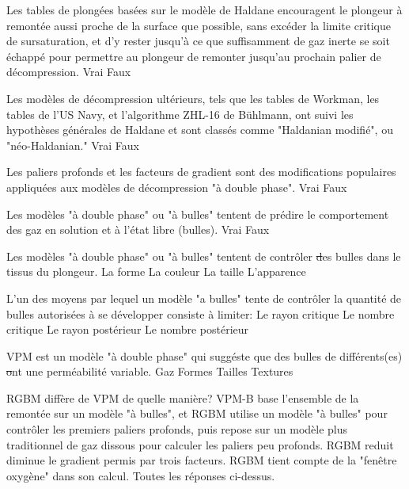 \documentclass[english,10pt,a4paper,twoside]{article}
\begin{document}
	\begin{outline}

		\1 Les tables de plongées basées sur le modèle de Haldane encouragent le plongeur à remontée aussi proche de la surface que possible, sans excéder la limite critique de sursaturation, et d'y rester jusqu'à ce que suffisamment de gaz inerte se soit échappé pour permettre au plongeur de remonter jusqu'au prochain palier de décompression.
			\2 Vrai
			\2 Faux

		\1 Les modèles de décompression ultérieurs, tels que les tables de Workman, les tables de l'US Navy, et l'algorithme ZHL-16 de Bühlmann, ont suivi les hypothèses générales de Haldane et sont classés comme "Haldanian modifié", ou "néo-Haldanian."
			\2 Vrai
			\2 Faux

		\1 Les paliers profonds et les facteurs de gradient sont des modifications populaires appliquées aux modèles de décompression "à double phase".
			\2 Vrai
			\2 Faux

		\1 Les modèles "à double phase" ou "à bulles" tentent de prédire le comportement des gaz en solution et à l'état libre (bulles).
			\2 Vrai
			\2 Faux

		\1 Les modèles "à double phase" ou "à bulles" tentent de contrôler \st des bulles dans le tissus du plongeur.
			\2 La forme
			\2 La couleur
			\2 La taille
			\2 L'apparence

		\1 L'un des moyens par lequel un modèle "a bulles" tente de contrôler la quantité de bulles autorisées à se développer consiste à limiter:
			\2 Le rayon critique
			\2 Le nombre critique
			\2 Le rayon postérieur
			\2 Le nombre postérieur

		\1 VPM est un modèle "à double phase" qui suggéste que des bulles de différents(es) \st ont une perméabilité variable.
			\2 Gaz
			\2 Formes
			\2 Tailles
			\2 Textures

		\1 RGBM diffère de VPM de quelle manière?
			\2 VPM-B base l'ensemble de la remontée sur un modèle "à bulles", et RGBM utilise un modèle "à bulles" pour contrôler les premiers paliers profonds, puis repose sur un modèle plus traditionnel de gaz dissous pour calculer les paliers peu profonds.
			\2 RGBM reduit diminue le gradient permis par trois facteurs.
			\2 RGBM tient compte de la "fenêtre oxygène" dans son calcul.
			\2 Toutes les réponses ci-dessus.
	\end{outline}
	\vfill
	\pagebreak

\end{document}
